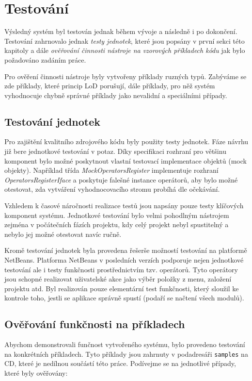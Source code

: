 \chapter{Testování}

Výsledný systém byl testován jednak během vývoje a následně i po dokončení. Testování zahrnovalo jednak \emph{testy jednotek}, které jsou popsány v první sekci této kapitoly a dále \emph{ověřování činnosti nástroje na vzorových příkladech kódu} jak bylo požadováno zadáním práce.

Pro ověření činnosti nástroje byly vytvořeny příklady ruzných typů. Zabýváme se zde příklady, které princip LoD porušují, dále příklady, pro něž systém vyhodnocuje chybně správné příklady jako nevalidní a speciálními případy.

\section{Testování jednotek}
Pro zajištění kvalitního zdrojového kódu byly použity testy jednotek. Fáze návrhu již bere jednotkové testování v potaz. Díky specifikaci rozhraní pro většinu komponent bylo možné poskytnout vlastní testovací implementace objektů (mock objekty). Například třída \emph{MockOperatorsRegister} implementuje rozhraní \emph{OperatorsRegisterIface} a poskytuje falešné instance operátorů, aby bylo možné otestovat, zda vytváření vyhodnocovacího stromu probíhá dle očekávání.

Vzhledem k časové náročnosti realizace testů jsou napsány pouze testy klíčových komponent systému. Jednotkové testování bylo velmi pohodlným nástrojem zejména v počátečních fázích projektu, kdy celý projekt nebyl spustitelný a nebylo jej možné otestovat navíc ručně.

Kromě testování jednotek byla provedena řešerše možností testování na platformě NetBeans. Platforma NetBeans v posledních verzích podporuje nejen jednotkové testování ale i testy funkčnosti prostřednictvím tzv. operátorů. Tyto operátory jsou schopné realizovat uživatelské akce jako výběr položky z menu, založení projektu atd. Byl realizován pouze elementární test funkčnosti, který sloužil ke kontrole toho, jestli se aplikace správně spustí (podaří se načtení všech modulů).

\section{Ověřování funkčnosti na příkladech}
Abychom demonstrovali funčnost vytvořeného systému, bylo provedeno testování na konkrétních příkladech. Tyto příklady jsou zahrnuty v podadresáři \verb+samples+ na CD, které je nedílnou součástí této práce. Podívejme se na jednotlivé případy, které byly ověřovány:


